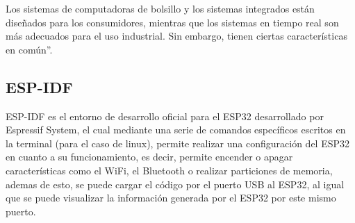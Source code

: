Los sistemas de computadoras de bolsillo y los sistemas integrados están diseñados para los consumidores, mientras que los sistemas en tiempo real son más adecuados para el uso industrial. Sin embargo, tienen ciertas características en común''.\\

\subsection{ESP-IDF}

ESP-IDF es el entorno de desarrollo oficial para el ESP32 desarrollado por Espressif System, el cual mediante una serie de comandos específicos escritos en la terminal (para el caso de linux), permite realizar una configuración del ESP32 en cuanto a su funcionamiento, es decir, permite encender o apagar características como el WiFi, el Bluetooth o realizar particiones de memoria, ademas de esto, se puede cargar el código por el puerto USB al ESP32, al igual que se puede visualizar la información generada por el ESP32 por este mismo puerto.\\